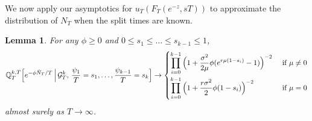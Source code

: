 \documentclass{article}
\theoremstyle{plain}
\newtheorem{lem}[thm]{Lemma}
\theoremstyle{definition}
\newcommand{\Q}{\mathbb{Q}}
\newcommand{\G}{\mathcal{G}}
\begin{document}
We now apply our asymptotics for $u_T(F_T(e^{-z},sT))$ to approximate the distribution of $N_T$ when the split times are known.

\begin{lem}\label{lemmgfconv}
For any $\phi\ge 0$ and $0\le s_1\le \ldots\le s_{k-1}\le 1$,
\[\Q^{k,T}_T\Big[e^{-\phi\tilde N_T/T}\,\Big|\,\G^k_T,\,\frac{\psi_1}{T} = s_1, \ldots, \frac{\psi_{k-1}}{T} = s_k\Big] \to \begin{cases} \displaystyle\prod_{i=0}^{k-1} \Big(1+\frac{\sigma^2}{2\mu}\phi(e^{r\mu(1-s_i)}-1)\Big)^{-2} & \hbox{ if } \mu \neq 0\\[4mm]
\displaystyle \prod_{i=0}^{k-1} \Big(1+\frac{r\sigma^2}{2}\phi(1-s_i)\Big)^{-2} & \hbox{ if } \mu = 0\end{cases}\]
almost surely as $T\to\infty$.
\end{lem}
\end{document}
